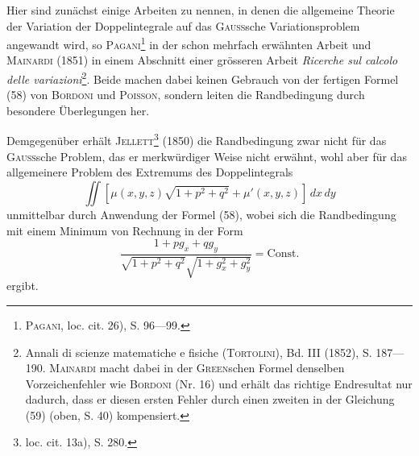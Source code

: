 Hier sind zunächst einige Arbeiten zu nennen, in denen die allgemeine
Theorie der Variation der Doppelintegrale auf das \textsc{Gauss}sche Variationsproblem
angewandt wird, so \textsc{Pagani}\footnote{\textsc{Pagani}, loc. cit. 26), S. 96—99.} in der schon mehrfach erwähnten Arbeit und \textsc{Mainardi}
(1851) in einem Abschnitt einer grösseren Arbeit \textit{Ricerche sul calcolo delle
variazioni}\footnote{Annali di scienze matematiche e fisiche (\textsc{Tortolini}), Bd. III (1852), S. 187—190. \textsc{Mainardi}
macht dabei in der \textsc{Green}schen Formel denselben Vorzeichenfehler wie \textsc{Bordoni} (Nr. 16) und erhält das
richtige Endresultat nur dadurch, dass er diesen ersten Fehler durch einen zweiten in der Gleichung (59)
(oben, S. 40) kompensiert.}. Beide machen dabei keinen Gebrauch von der fertigen Formel (58)
\clearpage{}
\noindent von \textsc{Bordoni} und \textsc{Poisson}, sondern leiten die Randbedingung durch besondere
Überlegungen her.

Demgegenüber erhält \textsc{Jellett}\footnote{loc. cit. 13a), S. 280.} (1850) die Randbedingung zwar nicht
für das \textsc{Gauss}sche Problem, das er merkwürdiger Weise nicht erwähnt, wohl
aber für das allgemeinere Problem des Extremums des Doppelintegrals
\[
\iint[\mu(x,y,z)\sqrt{1+p^2+q^2}+\mu'(x,y,z)]\,dx\,dy
\]
unmittelbar durch Anwendung der Formel (58), wobei sich die Randbedingung
mit einem Minimum von Rechnung in der Form
\[
\frac{1+pg_x+qg_y}{\sqrt{1+p^2+q^2}\sqrt{1+g_x^2+g_y^2}}=\text{Const.}
\]
ergibt.
\par\clearpage\endgroup

